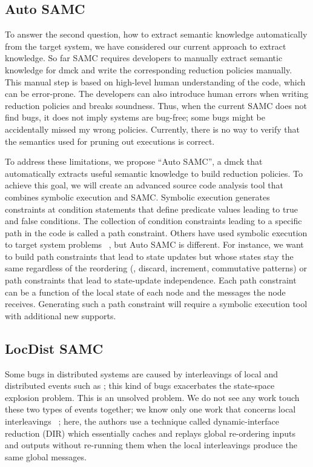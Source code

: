 \subsection{Auto SAMC}
To answer the second question, how to extract semantic knowledge automatically
from the target system, we have considered our current approach to extract
knowledge. So far SAMC requires developers to manually extract semantic
knowledge for dmck and write the corresponding reduction policies manually. This
manual step is based on high-level human understanding of the code, which can be
error-prone. The developers can also introduce human errors when writing
reduction policies and breaks soundness. Thus, when the current SAMC does not
find bugs, it does not imply systems are bug-free; some bugs might be
accidentally missed my wrong policies.  Currently, there is no way to verify
that the semantics used for pruning out executions is correct.

To address these limitations, we propose ``Auto SAMC'', a dmck that automatically
extracts useful semantic knowledge to build reduction policies. To achieve this
goal, we will create an advanced source code analysis tool that combines
symbolic execution and SAMC. Symbolic execution generates constraints at
condition statements that define predicate values leading to true and false
conditions. The collection of condition constraints leading to a specific path
in the code is called a path constraint. Others have used symbolic execution to
target system problems ~\cite{Bucur+14-SymbolicExecution}, but Auto SAMC is
different. For instance, we want to build path constraints that lead to state
updates but whose states stay the same regardless of the reordering (\eg,
discard, increment, commutative patterns) or path constraints that lead to
state-update independence. Each path constraint can be a function of the local
state of each node and the messages the node receives. Generating such a path
constraint will require a symbolic execution tool with additional new supports.

\subsection{LocDist SAMC}
Some bugs in distributed systems are caused by interleavings of local and
distributed events such as ; this kind of bugs exacerbates the
state-space explosion problem. This is an unsolved problem. We do not see any
work touch these two types of events together; we know only one work that
concerns local interleavings ~\cite{Guo+11-Demeter}; here, the authors use a
technique called dynamic-interface reduction (DIR) which essentially caches and
replays global re-ordering inputs and outputs without re-running them when the
local interleavings produce the same global messages. 

